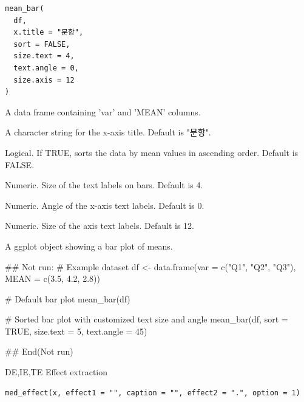 \documentclass[a4paper]{book}
\begin{document}
%
\begin{Usage}
\begin{verbatim}
mean_bar(
  df,
  x.title = "문항",
  sort = FALSE,
  size.text = 4,
  text.angle = 0,
  size.axis = 12
)
\end{verbatim}
\end{Usage}
%
\begin{Arguments}
\begin{ldescription}
\item[\code{df}] A data frame containing 'var' and 'MEAN' columns.

\item[\code{x.title}] A character string for the x-axis title. Default is "문항".

\item[\code{sort}] Logical. If TRUE, sorts the data by mean values in ascending order. Default is FALSE.

\item[\code{size.text}] Numeric. Size of the text labels on bars. Default is 4.

\item[\code{text.angle}] Numeric. Angle of the x-axis text labels. Default is 0.

\item[\code{size.axis}] Numeric. Size of the axis text labels. Default is 12.
\end{ldescription}
\end{Arguments}
%
\begin{Value}
A ggplot object showing a bar plot of means.
\end{Value}
%
\begin{Examples}
\begin{ExampleCode}
\#\# Not run: 
# Example dataset
df <- data.frame(var = c("Q1", "Q2", "Q3"), MEAN = c(3.5, 4.2, 2.8))

# Default bar plot
mean_bar(df)

# Sorted bar plot with customized text size and angle
mean_bar(df, sort = TRUE, size.text = 5, text.angle = 45)

## End(Not run)
\end{ExampleCode}
\end{Examples}
%
\begin{Description}
DE,IE,TE Effect extraction
\end{Description}
%
\begin{Usage}
\begin{verbatim}
med_effect(x, effect1 = "", caption = "", effect2 = ".", option = 1)
\end{verbatim}
\end{Usage}
\end{document}

